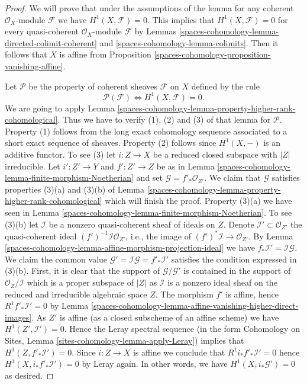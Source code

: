 \begin{proof}
We will prove that under the assumptions of the lemma for any coherent
$\mathcal{O}_X$-module $\mathcal{F}$ we have $H^1(X, \mathcal{F}) = 0$.
This implies that $H^1(X, \mathcal{F}) = 0$ for every quasi-coherent
$\mathcal{O}_X$-module $\mathcal{F}$ by
Lemmas \ref{spaces-cohomology-lemma-directed-colimit-coherent} and \ref{spaces-cohomology-lemma-colimits}.
Then it follows that $X$ is affine from
Proposition \ref{spaces-cohomology-proposition-vanishing-affine}.

\medskip\noindent
Let $\mathcal{P}$ be the property of coherent sheaves
$\mathcal{F}$ on $X$ defined by the rule
$$
\mathcal{P}(\mathcal{F}) \Leftrightarrow H^1(X, \mathcal{F}) = 0.
$$
We are going to apply Lemma \ref{spaces-cohomology-lemma-property-higher-rank-cohomological}.
Thus we have to verify (1), (2) and (3) of that lemma for $\mathcal{P}$.
Property (1) follows from the long exact cohomology sequence associated
to a short exact sequence of sheaves. Property (2) follows since
$H^1(X, -)$ is an additive functor. To see (3) let $i : Z \to X$ be
a reduced closed subspace with $|Z|$ irreducible. Let $i' : Z' \to Y$
and $f' : Z' \to Z$ be as in Lemma \ref{spaces-cohomology-lemma-finite-morphism-Noetherian}
and set $\mathcal{G} = f'_*\mathcal{O}_{Z'}$. We claim that
$\mathcal{G}$ satisfies properties (3)(a) and (3)(b) of
Lemma \ref{spaces-cohomology-lemma-property-higher-rank-cohomological}
which will finish the proof. Property (3)(a) we have seen in
Lemma \ref{spaces-cohomology-lemma-finite-morphism-Noetherian}. To see (3)(b) let
$\mathcal{I}$ be a nonzero quasi-coherent sheaf of ideals on $Z$.
Denote $\mathcal{I}' \subset \mathcal{O}_{Z'}$ the quasi-coherent
ideal $(f')^{-1}\mathcal{I} \mathcal{O}_{Z'}$, i.e., the
image of $(f')^*\mathcal{I} \to \mathcal{O}_{Z'}$.
By Lemma \ref{spaces-cohomology-lemma-affine-morphism-projection-ideal} we have
$f_*\mathcal{I}' = \mathcal{I} \mathcal{G}$.
We claim the common value
$\mathcal{G}' = \mathcal{I} \mathcal{G} = f'_*\mathcal{I}'$
satisfies the condition expressed in (3)(b).
First, it is clear that the support of $\mathcal{G}/\mathcal{G}'$
is contained in the support of $\mathcal{O}_Z/\mathcal{I}$
which is a proper subspace of $|Z|$ as $\mathcal{I}$ is a
nonzero ideal sheaf on the reduced and irreducible algebraic space $Z$.
The morphism $f'$ is affine, hence $R^1f'_*\mathcal{I}' = 0$ by
Lemma \ref{spaces-cohomology-lemma-affine-vanishing-higher-direct-images}.
As $Z'$ is affine (as a closed subscheme of an affine scheme)
we have $H^1(Z', \mathcal{I}') = 0$. Hence the Leray
spectral sequence (in the form
Cohomology on Sites, Lemma \ref{sites-cohomology-lemma-apply-Leray})
implies that $H^1(Z, f'_*\mathcal{I}') = 0$.
Since $i : Z \to X$ is affine we conclude that
$R^1i_*f'_*\mathcal{I}' = 0$ hence $H^1(X, i_*f'_*\mathcal{I}') = 0$
by Leray again. In other words, we have $H^1(X, i_*\mathcal{G}') = 0$
as desired.
\end{proof}

